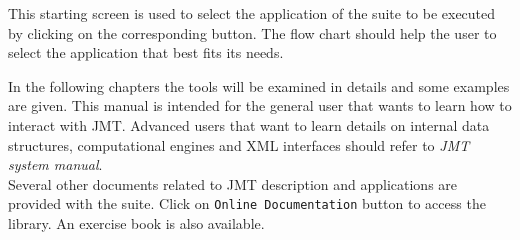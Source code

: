 This starting screen is used to select the application of the
suite to be executed by clicking on the corresponding button. The
flow chart should help the user to select the application that
best fits its needs.

In the following chapters the tools will be examined in details
and some examples are given. This manual is intended for the
general user that wants to learn how to interact with JMT.
Advanced users that want to learn details on internal data
structures, computational engines and XML interfaces should refer
to \emph{JMT system manual}.\\
Several other documents related to JMT description and
applications are provided with the suite. Click on \texttt{Online
Documentation} button to access the library. An exercise
book is also available.\\
